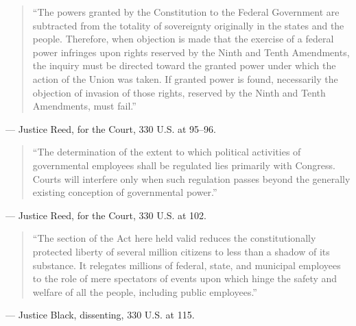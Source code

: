 \documentclass[12pt]{article}
\begin{document}
\begin{quote}
``The powers granted by the Constitution to the Federal Government are subtracted from the totality of sovereignty originally in the states and the people. Therefore, when objection is made that the exercise of a federal power infringes upon rights reserved by the Ninth and Tenth Amendments, the inquiry must be directed toward the granted power under which the action of the Union was taken. If granted power is found, necessarily the objection of invasion of those rights, reserved by the Ninth and Tenth Amendments, must fail.''
\end{quote}
\noindent --- Justice Reed, for the Court, 330 U.S. at 95--96.

\begin{quote}
``The determination of the extent to which political activities of governmental employees shall be regulated lies primarily with Congress. Courts will interfere only when such regulation passes beyond the generally existing conception of governmental power.''
\end{quote}
\noindent --- Justice Reed, for the Court, 330 U.S. at 102.

\begin{quote}
``The section of the Act here held valid reduces the constitutionally protected liberty of several million citizens to less than a shadow of its substance. It relegates millions of federal, state, and municipal employees to the role of mere spectators of events upon which hinge the safety and welfare of all the people, including public employees.''
\end{quote}
\noindent --- Justice Black, dissenting, 330 U.S. at 115.
\end{document}
